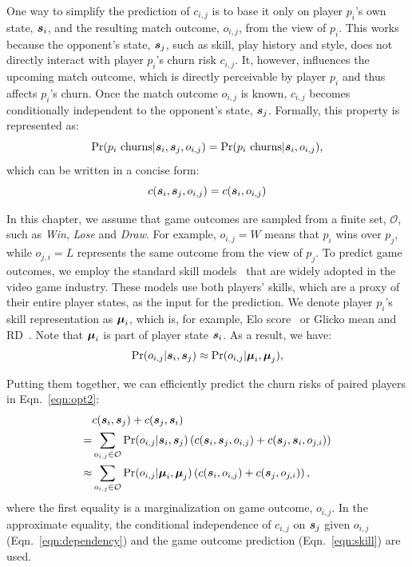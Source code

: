 One way to simplify the prediction of $c_{i,j}$ is to base it only on player $p_i$'s own state, $\boldsymbol{s}_i$, and the resulting match outcome, $o_{i,j}$, from the view of $p_i$. This works because the opponent's state, $\boldsymbol{s}_j$, such as skill, play history and style, does not directly interact with player $p_i$'s churn risk $c_{i,j}$. It, however, influences the upcoming match outcome, which is directly perceivable by player $p_i$ and thus affects $p_i$'s churn. Once the match outcome $o_{i,j}$ is known, $c_{i,j}$ becomes conditionally independent to the opponent's state, $\boldsymbol{s}_j$. Formally, this property is represented as:
\begin{equation}\label{eqn:dependency_raw}
\Pr(p_i \text{ churns} | \boldsymbol{s}_i, \boldsymbol{s}_j, o_{i,j}) = \Pr(p_i \text{ churns} | \boldsymbol{s}_i, o_{i,j}),
\end{equation}
which can be written in a concise form:
\begin{equation}\label{eqn:dependency}
c(\boldsymbol{s}_i, \boldsymbol{s}_j, o_{i,j}) = c(\boldsymbol{s}_i, o_{i,j})
\end{equation}

In this chapter, we assume that game outcomes are sampled from a finite set, $\mathcal{O}$, such as \emph{Win}, \emph{Lose} and \emph{Draw}. For example, $o_{i,j}=W$ means that $p_i$ wins over $p_j$, while $o_{j,i}=L$ represents the same outcome from the view of $p_j$. To predict game outcomes, we employ the standard skill models~\citep{elo1978rating,glickman1999parameter} that are widely adopted in the video game industry. These models use both players' skills, which are a proxy of their entire player states, as the input for the prediction. We denote player $p_i$'s skill representation as $\boldsymbol{\mu}_i$, which is, for example, Elo score~\citep{elo1978rating} or Glicko mean and RD~\citep{glickman1999parameter}. Note that $\boldsymbol{\mu}_i$ is part of player state $\boldsymbol{s}_i$.  As a result, we have:
\begin{equation}\label{eqn:skill}
\Pr(o_{i,j}|\boldsymbol{s}_i, \boldsymbol{s}_j) \approx \Pr(o_{i,j}|\boldsymbol{\mu}_i, \boldsymbol{\mu}_j),
\end{equation}

Putting them together, we can efficiently predict the churn risks of paired players in Eqn.~\ref{eqn:opt2}:
\begin{align}
&c(\boldsymbol{s}_i, \boldsymbol{s}_j) + c(\boldsymbol{s}_j, \boldsymbol{s}_i) \label{eqn:c1} \\
=& \sum\limits_{o_{i,j} \in \mathcal{O}} \Pr(o_{i,j}|\boldsymbol{s}_i, \boldsymbol{s}_j)\left( c(\boldsymbol{s}_i, \boldsymbol{s}_j, o_{i,j}) + c(\boldsymbol{s}_j, \boldsymbol{s}_i, o_{j,i}) \right) \label{eqn:c2} \\
\approx & \sum\limits_{o_{i,j} \in \mathcal{O}} \Pr(o_{i,j}|\boldsymbol{\mu}_i, \boldsymbol{\mu}_j)\left( c(\boldsymbol{s}_i, o_{i,j}) + c(\boldsymbol{s}_j, o_{j,i}) \right), \label{eqn:c3}
\end{align}
where the first equality is a marginalization on game outcome, $o_{i,j}$. In the approximate equality, the conditional independence of $c_{i,j}$ on $\boldsymbol{s}_j$ given $o_{i,j}$ (Eqn.~\ref{eqn:dependency}) and the game outcome prediction (Eqn.~\ref{eqn:skill}) are used.

